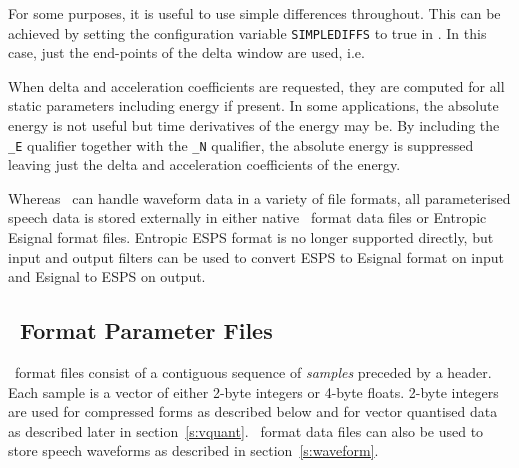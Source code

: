 For some purposes, it is useful to use simple differences throughout.  This
can be achieved by setting the configuration 
variable \texttt{SIMPLEDIFFS}
to true in .  In this case, just the end-points of the delta window
are used, i.e.

When delta and acceleration coefficients are requested, they are computed for
all static parameters including energy if present.  In some applications, the
absolute energy is not useful but time derivatives of the energy may be.  By
including the \texttt{\_E} qualifier together with the
\texttt{\_N} qualifier, the absolute energy
is suppressed leaving just the delta and acceleration coefficients of the
energy.


Whereas \HTK\ can handle waveform data in a variety of file formats,
all parameterised speech data is stored externally in either native
\HTK\ format data files or Entropic Esignal format files.
Entropic ESPS format is no longer supported directly, but input and output
filters can be used to convert ESPS to Esignal format on input and
Esignal to ESPS on output.

\subsection{\HTK\ Format Parameter Files}

\HTK\ format files consist of a contiguous sequence of \textit{samples}
preceded by a header.  Each sample is a vector of either 2-byte integers or
4-byte floats.  2-byte integers are used for compressed forms as described
below and for vector quantised data as described later in
section~\ref{s:vquant}.  \HTK\ format data files can also be used to store
speech waveforms as described in section~\ref{s:waveform}.  

